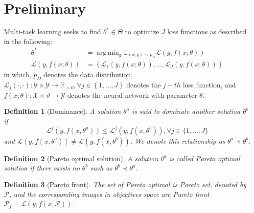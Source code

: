 \documentclass[letterpaper]{article} %
\newtheorem{definition}{Definition}
\DeclareMathOperator*{\argmin}{arg\,min}
\begin{document}
\section{Preliminary}
\label{st:2}
Multi-task learning seeks to find $\theta^* \in \Theta$ to optimize $J$ loss functions as described in the following:
\begin{align}
    \theta^* &= \argmin_{\theta} \mathbb{E}_{(x, y) \sim p_D} \mathcal{L}\left(y, f\left(x; \theta \right)\right)\\
    \mathcal{L}\left(y, f\left(x; \theta \right)\right) &=\left\{ \mathcal{L}_1\left(y, f\left(x; \theta \right)\right),
    \nonumber
    \dots,
     \mathcal{L}_J\left(y, f\left(x; \theta \right)\right) \right\}
\end{align}
in which, $p_D$ denotes the data distribution,  $\mathcal{L}_j\left(\cdot, \cdot \right):
\mathcal{Y} \times \mathcal{Y} \rightarrow \mathbb{R}_{>0}, \forall j \in
\left\{1, \dots, J\right\}$ denotes the $j-th$ loss function, and $f\left(x; \theta \right): \mathcal{X} \times \vartheta \rightarrow \mathcal{Y}$ denotes the neural network with parameter $\theta$.

\begin{definition}[Dominance] A solution $\theta^a$ is said to dominate another solution $\theta^b$ if $$\mathcal{L}^j(y, f(x, \theta^a)) \leq \mathcal{L}^j(y, f(x, \theta^b)), \forall j \in \{1,...,J\}$$ and $\mathcal{L}(y, f(x, \theta^a)) \neq \mathcal{L}(y, f(x, \theta^b))$. We denote this relationship as $\theta^a \prec \theta^b$.
\label{def:paretodominance}
\end{definition}

\begin{definition}[Pareto optimal solution] A solution $\theta^a$ is called Pareto optimal solution if there exists no $\theta^b$ such as $\theta^b \prec \theta^a$.
\label{def:paretooptimality}
\end{definition}

\begin{definition}[Pareto front] The set of Pareto optimal is Pareto set, denoted by $\mathcal{P}$, and the corresponding images in objectives space are Pareto front $\mathcal{P}_f=\mathcal{L}(y, f(x, \mathcal{P}))$.
\end{definition}
\end{document}
